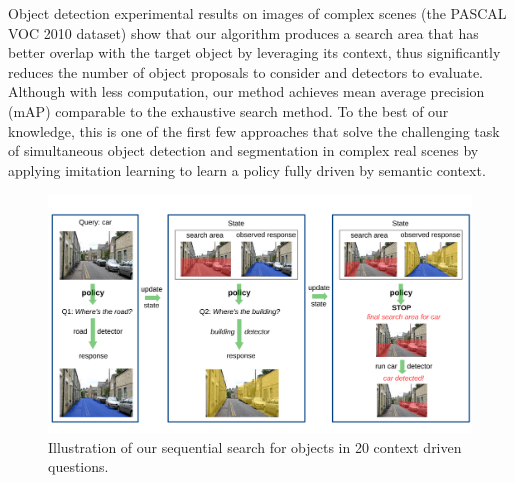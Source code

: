 Object detection experimental results on images of complex scenes (the PASCAL VOC 2010 dataset) show that our algorithm produces a search area that has better overlap with the target object by leveraging its context, 
thus significantly reduces the number of object proposals to consider and detectors to evaluate.
Although with less computation, our method achieves mean average precision (mAP) comparable to the exhaustive search method. 
To the best of our knowledge, this is one of the first few approaches that solve the challenging task of simultaneous object detection and segmentation in complex real scenes by applying imitation learning to learn a policy fully driven by semantic context.


\begin{figure}[htb]
\begin{center}
\includegraphics[width=\linewidth]{figures/iccv20q-overview.pdf}
\caption{Illustration of our sequential search for objects in 20 context driven questions.}
\label{fig:20Qintro}
\end{center}
\end{figure}





